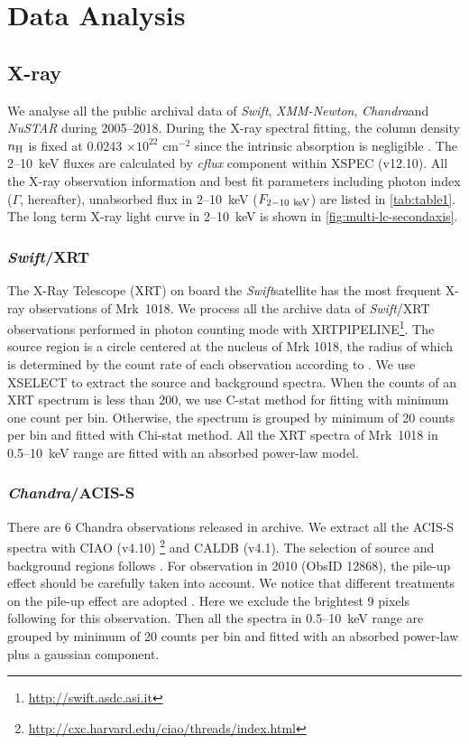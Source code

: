 \documentclass[twocolumn]{aastex63}
\newcommand{\xmm}{{\em XMM-Newton}}
\newcommand{\nustar}{{\em NuSTAR }}
\newcommand{\chandra}{{\em Chandra}}
\newcommand{\swift}{{\em Swift}}
\begin{document}
\section{Data Analysis}\label{sec:data}
\subsection{X-ray}
We analyse all the public archival data of \swift, \xmm, \chandra and \nustar during 2005--2018. During the X-ray spectral fitting, the column density $n_{\rm{H}}$ is fixed at 0.0243 $\times 10^{22}$ cm$^{-2}$ since the intrinsic absorption is negligible \citep[see ][]{2016A&A...593L...9H}. The 2--10~keV fluxes are calculated by {\it cflux} component within {\scriptsize XSPEC} (v12.10). All the X-ray observation information and best fit parameters including photon index ($\Gamma$, hereafter), unabsorbed flux in 2--10~keV ($F_{\rm{2-10~keV}}$) are listed in \autoref{tab:table1}. The long term X-ray light curve in 2--10~keV is shown in \autoref{fig:multi-lc-secondaxis}.


\subsubsection{\swift/XRT}
The X-Ray Telescope (XRT) on board the \swift satellite has the most frequent X-ray observations of Mrk~1018. We process all the archive data of \swift/XRT observations performed in photon counting mode with {\scriptsize XRTPIPELINE}\footnote{\url{http://swift.asdc.asi.it}}. The source region is a circle centered at the nucleus of Mrk 1018, the radius of which is determined by the count rate of each observation according to \citet{2009MNRAS.397.1177E}. We use {\scriptsize XSELECT} to extract the source and background spectra. When the counts of an XRT spectrum is less than 200, we use C-stat method for fitting with minimum one count per bin. Otherwise, the spectrum is grouped by minimum of 20 counts per bin and fitted with Chi-stat method. All the XRT spectra of Mrk~1018 in 0.5--10~keV range are fitted with an absorbed power-law model. 


\subsubsection{\chandra/ACIS-S}
There are 6 Chandra observations released in archive. We extract all the ACIS-S spectra with CIAO (v4.10) \footnote{\url{http://cxc.harvard.edu/ciao/threads/index.html}} and {\scriptsize CALDB} (v4.1). The selection of source and background regions follows \citet{2017ApJ...840...11L}. For observation in 2010 (ObsID 12868), the pile-up effect should be carefully taken into account. We notice that different treatments on the pile-up effect are adopted \citep[see ][]{2017ApJ...840...11L,2016A&A...593L...9H,2017A&A...607L...9K}. Here we exclude the brightest 9 pixels following \citet{2016A&A...593L...9H} for this observation. Then all the spectra in 0.5--10~keV range are grouped by minimum of 20 counts per bin and fitted with an absorbed power-law plus a gaussian component. 
\end{document}
